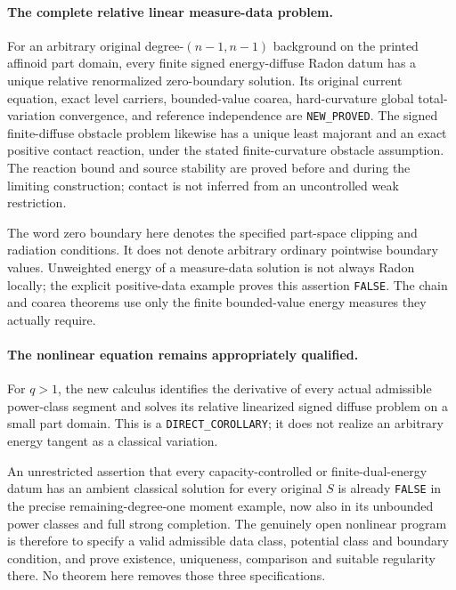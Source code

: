\documentclass[11pt,a4paper]{article}
\numberwithin{equation}{section}
\theoremstyle{definition}
\theoremstyle{remark}
\begin{document}
\paragraph{The complete relative linear measure-data problem.}
For an arbitrary original degree-$(n-1,n-1)$
background on the printed affinoid part domain,
every finite signed energy-diffuse Radon datum
has a unique relative renormalized zero-boundary
solution.  Its original current equation,
exact level carriers, bounded-value coarea,
hard-curvature global total-variation convergence,
and reference independence are
\texttt{NEW\_PROVED}.
The signed finite-diffuse obstacle problem
likewise has a unique least majorant and
an exact positive contact reaction, under
the stated finite-curvature obstacle
assumption.
The reaction bound and source stability
are proved before and during the limiting
construction; contact is not inferred
from an uncontrolled weak restriction.

The word zero boundary here denotes the
specified part-space clipping and radiation
conditions.  It does not denote arbitrary
ordinary pointwise boundary values.
Unweighted energy of a measure-data
solution is not always Radon locally;
the explicit positive-data example
proves this assertion \texttt{FALSE}.
The chain and coarea theorems use only
the finite bounded-value energy measures
they actually require.

\paragraph{The nonlinear equation remains appropriately qualified.}
For $q>1$, the new calculus identifies the
derivative of every actual admissible
power-class segment and solves its
relative linearized signed diffuse
problem on a small part domain.
This is a \texttt{DIRECT\_COROLLARY};
it does not realize an arbitrary energy
tangent as a classical variation.

An unrestricted assertion that every
capacity-controlled or finite-dual-energy
datum has an ambient classical solution
for every original $S$ is already
\texttt{FALSE} in the precise remaining-degree-one
moment example, now also in its unbounded
power classes and full strong completion.
The genuinely open nonlinear program is
therefore to specify a valid admissible
data class, potential class and boundary
condition, and prove existence, uniqueness,
comparison and suitable regularity there.
No theorem here removes those three
specifications.
\end{document}
